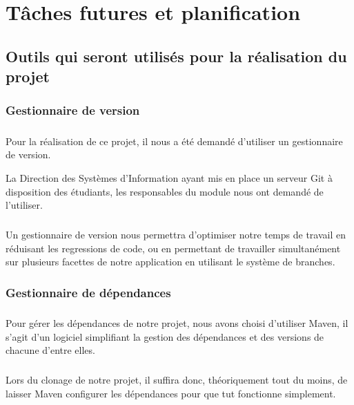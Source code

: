 \chapter{Tâches futures et planification}

\section{Outils qui seront utilisés pour la réalisation du projet}
\subsection{Gestionnaire de version}
\paragraph{}
Pour la réalisation de ce projet, il nous a été demandé d'utiliser un gestionnaire de version.

La Direction des Systèmes d'Information ayant mis en place un serveur Git à disposition des étudiants, les responsables du module nous ont demandé de l'utiliser.

\paragraph{}
Un gestionnaire de version nous permettra d'optimiser notre temps de travail en réduisant les regressions de code, ou en permettant de travailler simultanément sur plusieurs facettes de notre application en utilisant le système de branches.

\subsection{Gestionnaire de dépendances}
\paragraph{}
Pour gérer les dépendances de notre projet, nous avons choisi d'utiliser Maven, il s'agit d'un logiciel simplifiant la gestion des dépendances et des versions de chacune d'entre elles.

\paragraph{}
Lors du clonage de notre projet, il suffira donc, théoriquement tout du moins, de laisser Maven configurer les dépendances pour que tut fonctionne simplement.

